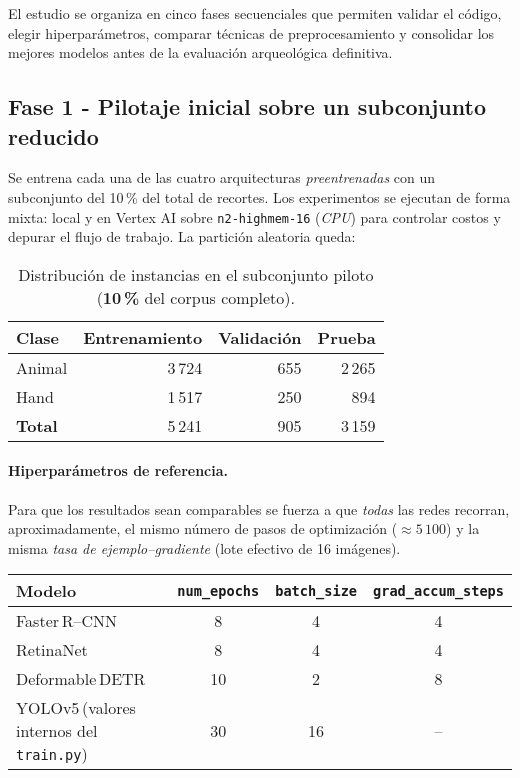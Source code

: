 El estudio se organiza en cinco fases secuenciales que permiten validar el código, elegir hiperparámetros, comparar técnicas de preprocesamiento y consolidar los mejores modelos antes de la evaluación arqueológica definitiva.

\subsection*{Fase 1 - Pilotaje inicial sobre un subconjunto reducido}

Se entrena cada una de las cuatro arquitecturas \emph{preentrenadas} con un subconjunto del 10\,\% del total de recortes.
Los experimentos se ejecutan de forma mixta: local y en Vertex AI sobre \texttt{n2-highmem-16} (\emph{CPU}) para controlar costos y depurar el flujo de trabajo.
La partición aleatoria queda:

\begin{table}[h]
    \centering
    \begin{tabular}{l r r r}
        \hline
        \textbf{Clase} & \textbf{Entrenamiento} & \textbf{Validación} & \textbf{Prueba} \\
        \hline
        Animal & 3\,724 & 655 & 2\,265 \\
        Hand   & 1\,517 & 250 &   894 \\
        \hline
        \textbf{Total} & 5\,241 & 905 & 3\,159 \\
    \end{tabular}
    \caption{Distribución de instancias en el subconjunto piloto (\textbf{10\,\%} del corpus completo).}
    \label{tab:pilot_split}
\end{table}

\paragraph{Hiperparámetros de referencia.}
Para que los resultados sean comparables se fuerza a que \emph{todas} las redes recorran, aproximadamente, el mismo número de pasos de optimización (\(\approx 5\,100\)) y la misma \emph{tasa de ejemplo–gradiente} (lote efectivo de 16 imágenes).

\begin{center}
\begin{tabular}{lccc}
\hline
\textbf{Modelo} & \texttt{num\_epochs} & \texttt{batch\_size} & \texttt{grad\_accum\_steps} \\
\hline
Faster\,R--CNN   & 8  & 4  & 4  \\
RetinaNet        & 8  & 4  & 4  \\
Deformable\,DETR & 10 & 2  & 8  \\
YOLOv5\,(valores internos del \texttt{train.py}) & 30 & 16 & -- \\
\hline
\end{tabular}
\end{center}

